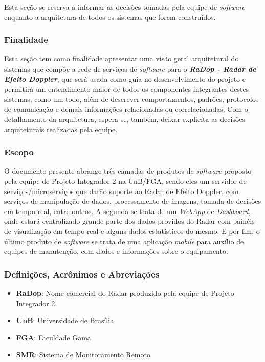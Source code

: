 Esta seção se reserva a informar as decisões tomadas pela equipe de \emph{software} enquanto a arquitetura de todos os sistemas que forem construídos.

\subsubsection{Finalidade}\label{finalidade}

Esta seção tem como finalidade apresentar uma visão geral arquitetural
do sistemas que compõe a rede de serviços de \emph{software} para o
\textbf{\emph{RaDop - Radar de Efeito Doppler}}, que será usada como
guia no desenvolvimento do projeto e permitirá um entendimento maior de
todos os componentes integrantes destes sistemas, como um todo, além de
descrever comportamentos, padrões, protocolos de comunicação e demais
informações relacionadas ou correlacionadas. Com o detalhamento da
arquitetura, espera-se, também, deixar explicíta as decisões
arquiteturais realizadas pela equipe.

\subsubsection{Escopo}\label{escopo}

O documento presente abrange três camadas de produtos de \emph{software}
proposto pela equipe de Projeto Integrador 2 na UnB/FGA, sendo eles um
servidor de serviços/microserviços que darão suporte ao Radar de Efeito
Doppler, com serviços de manipulação de dados, processamento de imagens,
tomada de decisões em tempo real, entre outros. A segunda se trata de um
\emph{WebApp} de \emph{Dashboard}, onde estará centralizado grande parte dos dados
providos do Radar com painéis de visualização em tempo real e alguns
dados estatísticos do mesmo. E por fim, o último produto de \emph{software} se
trata de uma aplicação \emph{\emph{mobile}} para auxílio de equipes de
manutenção, com dados e informações sobre o equipamento.

\subsubsection{Definições, Acrônimos e Abreviações}\label{definicoes-acronimos-e-abreviacoes}

\begin{itemize}
\tightlist
\item
  \textbf{RaDop}: Nome comercial do Radar produzido pela equipe de
  Projeto Integrador 2.
\item
  \textbf{UnB}: Universidade de Brasília
\item
  \textbf{FGA}: Faculdade Gama
\item
  \textbf{SMR}: Sistema de Monitoramento Remoto
\end{itemize}

